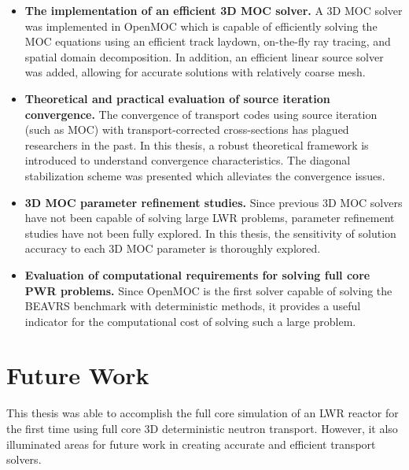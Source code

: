 \begin{emphbox}
\begin{itemize}
	
	\item \textbf{The implementation of an efficient 3D \ac{MOC} solver.} A 3D \ac{MOC} solver was implemented in OpenMOC which is capable of efficiently solving the \ac{MOC} equations using an efficient track laydown, on-the-fly ray tracing, and spatial domain decomposition. In addition, an efficient linear source solver was added, allowing for accurate solutions with relatively coarse mesh.
	
	\item \textbf{Theoretical and practical evaluation of source iteration convergence.} The convergence of transport codes using source iteration (such as MOC) with transport-corrected cross-sections has plagued researchers in the past. In this thesis, a robust theoretical framework is introduced to understand convergence characteristics. The diagonal stabilization scheme was presented which alleviates the convergence issues.
	
	\item \textbf{3D \ac{MOC} parameter refinement studies.} Since previous 3D \ac{MOC} solvers have not been capable of solving large \ac{LWR} problems, parameter refinement studies have not been fully explored. In this thesis, the sensitivity of solution accuracy to each 3D \ac{MOC} parameter is thoroughly explored.
	
	\item \textbf{Evaluation of computational requirements for solving full core \ac{PWR} problems.} Since OpenMOC is the first solver capable of solving the BEAVRS benchmark with deterministic methods, it provides a useful indicator for the computational cost of solving such a large problem.
	
\end{itemize}
\end{emphbox}


\newpage
\section{Future Work}
\label{sec:future-work}

This thesis was able to accomplish the full core simulation of an \ac{LWR} reactor for the first time using full core 3D deterministic neutron transport. However, it also illuminated areas for future work in creating accurate and efficient transport solvers.

